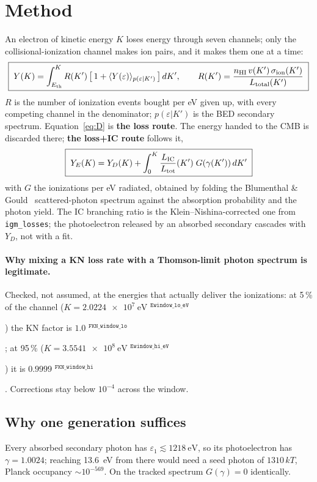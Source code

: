 \documentclass[11pt,a4paper]{article}
\newif\ifprovdraft
\newcommand{\src}[1]{%
  \ifprovdraft
    \ifmmode{}^{\text{\color{gray}\scriptsize\texttt{#1}}}%
    \else{\color{gray}\scriptsize$^{\texttt{#1}}$}%
    \fi
  \fi}
\begin{document}
\section{Method}
An electron of kinetic energy $K$ loses energy through seven channels; only the
collisional-ionization channel makes ion pairs, and it makes them one at a time:
\begin{equation}
\boxed{\;Y(K) = \int_{E_{\rm th}}^{K} R(K')\,
   \bigl[\,1 + \langle Y(\varepsilon)\rangle_{p(\varepsilon|K')}\,\bigr]\,dK',
 \qquad R(K') = \frac{n_{\rm HI}\,v(K')\,\sigma_{\rm ion}(K')}{L_{\rm total}(K')}\;}
\label{eq:D}
\end{equation}
$R$ is the number of ionization events bought per eV given up, with every
competing channel in the denominator; $p(\varepsilon|K')$ is the BED secondary
spectrum. Equation~\eqref{eq:D} is \textbf{the loss route}. The energy handed to the
CMB is discarded there; \textbf{the loss+IC route} follows it,
\begin{equation}
\boxed{\;Y_E(K) = Y_D(K) + \int_0^{K}
  \frac{L_{\rm IC}}{L_{\rm tot}}(K')\; G(\gamma(K'))\, dK'\;}
\label{eq:E}
\end{equation}
with $G$ the ionizations per eV radiated, obtained by folding the
Blumenthal \& Gould~\cite{bg70} scattered-photon spectrum against the absorption
probability and the photon yield. The IC branching ratio is the
Klein--Nishina-corrected one from \texttt{igm\_losses}; the photoelectron
released by an absorbed secondary cascades with $Y_D$, not with a fit.

\paragraph{Why mixing a KN loss rate with a Thomson-limit photon spectrum is
legitimate.} Checked, not assumed, at the energies that actually deliver the
ionizations: at 5\,\% of the channel
($K = \SI{2.0224e7}{\electronvolt}$\src{Ewindow\_lo\_eV}) the KN factor is
$1.0$\src{FKN\_window\_lo}; at 95\,\%
($K = \SI{3.5541e8}{\electronvolt}$\src{Ewindow\_hi\_eV}) it is
$0.9999$\src{FKN\_window\_hi}. Corrections stay below $10^{-4}$ across the
window.

\subsection{Why one generation suffices}\label{sec:closure}
Every absorbed secondary photon has $\varepsilon_1 \lesssim \SI{1218}{\electronvolt}$,
so its photoelectron has $\gamma = 1.0024$; reaching \SI{13.6}{\electronvolt}
from there would need a seed photon of $1310\,kT$, Planck occupancy
$\sim10^{-569}$. On the tracked spectrum $G(\gamma)=0$ identically.
\end{document}
